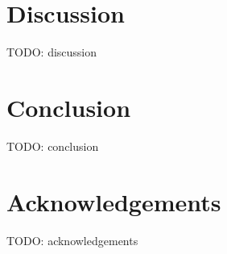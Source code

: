 \section{Discussion}

TODO: discussion

\section{Conclusion}

TODO: conclusion

\section{Acknowledgements}

TODO: acknowledgements

\newpage


\printbibliography[heading=bibintoc]{}

\newpage


\begin{appendices}

\end{appendices}


